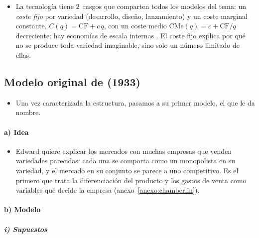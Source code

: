 \documentclass[11pt]{article}
\begin{document}
\begin{itemize}
\item La tecnología tiene 2~rasgos que comparten todos los modelos del tema: un \emph{coste fijo} por variedad (desarrollo, diseño, lanzamiento) y un coste marginal constante, $C(q)=\mathrm{CF}+c\,q$, con un coste medio $\mathrm{CMe}(q)=c+\mathrm{CF}/q$ decreciente: hay economías de escala internas . El coste fijo explica por qué no se produce toda variedad imaginable, sino solo un número limitado de ellas.
\end{itemize}

\subsection{Modelo original de  (1933)}\label{sec:chamberlin}

\begin{itemize}
\item Una vez caracterizada la estructura, pasamos a su primer modelo, el que le da nombre.
\end{itemize}

\paragraph{a) Idea}

\begin{itemize}
\item Edward \textcite{Chamberlin1933Theory} quiere explicar los mercados con muchas empresas que venden variedades parecidas: cada una se comporta como un monopolista en su variedad, y el mercado en su conjunto se parece a uno competitivo. Es el primero que trata la diferenciación del producto y los gastos de venta como variables que decide la empresa (anexo~\ref{anexo:chamberlin}).
\end{itemize}

\paragraph{b) Modelo}

\subparagraph{i) Supuestos}
\end{document}
